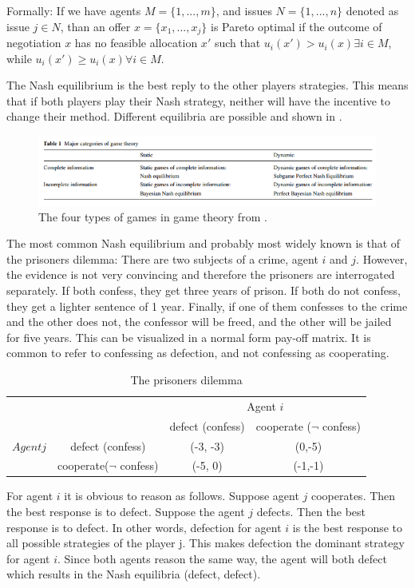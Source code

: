 Formally: If we have agents $M = \{1,...,m\}$, and issues $N = \{1,...,n\}$ denoted as issue $j\in N$, than an offer $x = \{x_1, ..., x_j\}$ is Pareto optimal if the outcome of negotiation $x$ has no feasible allocation $x'$ such that $u_i(x')> u_i(x) \exists i \in M$, while $u_i(x')\geq u_i(x) \forall i \in M$. 

The Nash equilibrium is the best reply to the other players strategies. This means that if both players play their Nash strategy, neither will have the incentive to change their method. Different equilibria are possible and shown in . 

\begin{figure}[h]
	\centering
	\includegraphics[width=0.9\linewidth]{img/major_categories_of_game_theory}
	\caption{The four types of games in game theory from \citet{trappey2013multi}.}
	\label{fig:majorcategoriesofgametheory}
\end{figure}
The most common Nash equilibrium and probably most widely known is that of the prisoners dilemma:
There are two subjects of a crime, agent $i$ and $j$. However, the evidence is not very convincing and therefore the prisoners are interrogated separately. If both confess, they get three years of prison. If both do not confess, they get a lighter sentence of 1 year. Finally, if one of them confesses to the crime and the other does not, the confessor will be freed, and the other will be jailed for five years.
This can be visualized in a normal form pay-off matrix. It is common to refer to confessing as defection, and not confessing as cooperating.
\begin{table}[h]

\begin{tabular}{|c|c|c|c|}
	\hline 
		&  				& \multicolumn{2}{c}{Agent $i$}\\ 
	 	&				& defect (confess) 	& cooperate ($\neg$ confess) \\ 
	$Agent j$	& defect (confess)	&  	(-3, -3)			& (0,-5) \\ 
		& cooperate($\neg $ confess) 	&  (-5, 0)				& (-1,-1) \\ 
	\hline 
\end{tabular} \label{tab:nashprison} \caption{The prisoners dilemma}
\end{table}
For agent $i$ it is obvious to reason as follows. Suppose agent $j$ cooperates. Then the best response is to defect. Suppose the agent $j$ defects. Then the best response is to defect. In other words, defection for agent $i$ is the best response to all possible strategies of the player j. This makes defection the dominant strategy for agent $i$. Since both agents reason the same way, the agent will both defect which results in the Nash equilibria (defect, defect).

